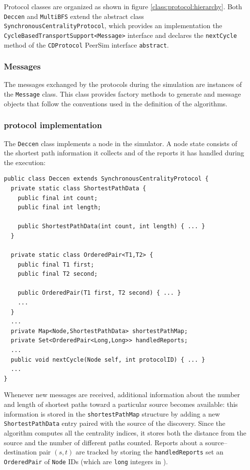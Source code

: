 Protocol classes are organized as shown in figure \ref{class:protocol:hierarchy}. Both \texttt{Deccen} and \texttt{MultiBFS} extend the abstract class \texttt{SynchronousCentralityProtocol}, which provides an implementation the \texttt{Cycle\-Based\-Transport\-Support<Message>} interface and declares the \texttt{nextCycle} method of the \texttt{CDProtocol} PeerSim interface \texttt{abstract}.

\subsubsection{Messages}
The messages exchanged by the protocols during the simulation are instances of the \texttt{Message} class. This class provides factory methods to generate \mdisc{} and \mrep{} message objects that follow the conventions used in the definition of the algorithms. 

\subsubsection{\deccen{} protocol implementation}

The \texttt{Deccen} class implements a \deccen{} node in the simulator. A node state consists of the shortest path information it collects and of the reports it has handled during the execution:
\begin{verbatim}
public class Deccen extends SynchronousCentralityProtocol {
  private static class ShortestPathData {
    public final int count;
    public final int length;

    public ShortestPathData(int count, int length) { ... }
  }

  private static class OrderedPair<T1,T2> {
    public final T1 first;
    public final T2 second;

    public OrderedPair(T1 first, T2 second) { ... }
    ...
  }
  ...
  private Map<Node,ShortestPathData> shortestPathMap;
  private Set<OrderedPair<Long,Long>> handledReports;
  ...
  public void nextCycle(Node self, int protocolID) { ... }
  ...
}
\end{verbatim}
Whenever new \mdisc{} messages are received, additional information about the number and length of shortest paths toward a particular source becomes available: this information is stored in the \texttt{shortestPathMap} structure by adding a new \texttt{ShortestPathData} entry paired with the source of the discovery. Since the algorithm computes all the centrality indices, it stores both the distance from the source and the number of different paths counted. Reports about a source--destination pair $(s,t)$ are tracked by storing the \texttt{handledReports} set an \texttt{Ordered\-Pair} of \texttt{Node} IDs (which are \texttt{long} integers in \peersim{}).

